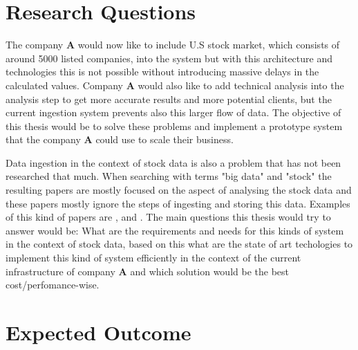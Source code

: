 \documentclass[article,11pt]{article}
\begin{document}
\section{Research Questions}

The company \textbf{A} would now like to include U.S stock market, which consists of around 5000 listed companies, into the system but with this architecture and technologies this is not possible without introducing massive delays in the calculated values. Company \textbf{A} would also like to add technical analysis into the analysis step to get more accurate results and more potential clients, but the current ingestion system prevents also this larger flow of data. The objective of this thesis would be to solve these problems and implement a prototype system that the company \textbf{A} could use to scale their business.


Data ingestion in the context of stock data is also a problem that has not been researched that much. When searching with terms "big data" and "stock" the resulting papers are mostly focused on the aspect of analysing the stock data and these papers mostly ignore the steps of ingesting and storing this data. Examples of this kind of papers are \cite{wu}, \cite{aghakhani} and \cite{kao}. The main questions this thesis would try to answer would be: What are the requirements and needs for this kinds of system in the context of stock data, based on this what are the state of art techologies to implement this kind of system efficiently in the context of the current infrastructure of company \textbf{A} and which solution would be the best cost/perfomance-wise.

\section{Expected Outcome}
\end{document}
